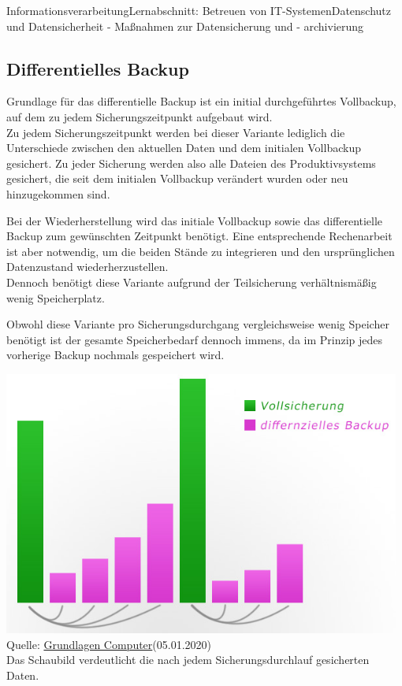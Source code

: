 \documentclass[11pt,oneside,openany,headings=optiontotoc,11pt,numbers=noenddot]{article}
\begin{document}
\begin{worksheet}{Informationsverarbeitung}{Lernabschnitt: Betreuen von IT-Systemen}{Datenschutz und Datensicherheit - Maßnahmen zur Datensicherung und - archivierung}
		\subsection{Differentielles Backup}
		Grundlage für das differentielle Backup ist ein initial durchgeführtes Vollbackup, auf dem zu jedem Sicherungszeitpunkt aufgebaut wird.\\
		Zu jedem Sicherungszeitpunkt werden bei dieser Variante lediglich die Unterschiede zwischen den aktuellen Daten und dem initialen Vollbackup gesichert. Zu jeder Sicherung werden also alle Dateien des Produktivsystems gesichert, die seit dem initialen Vollbackup verändert wurden oder neu hinzugekommen sind.\\
		\par\noindent
		Bei der Wiederherstellung wird das initiale Vollbackup sowie das differentielle Backup zum gewünschten Zeitpunkt benötigt. Eine entsprechende Rechenarbeit ist aber notwendig, um die beiden Stände zu integrieren und den ursprünglichen Datenzustand wiederherzustellen.\\
		Dennoch benötigt diese Variante aufgrund der Teilsicherung verhältnismäßig wenig Speicherplatz.\\
		\par\noindent
		Obwohl diese Variante pro Sicherungsdurchgang vergleichsweise wenig Speicher benötigt ist der gesamte Speicherbedarf dennoch immens, da im Prinzip jedes vorherige Backup nochmals gespeichert wird.\\
		\par\noindent
		\includegraphics[width=0.98\textwidth]{../99_Bilder/01_diff.jpg}\\
		\tiny{Quelle: \href{https://www.grundlagen-computer.de/backup/backup-strategien-inkrementell-differentiell-und-vollbackup}{Grundlagen Computer}(05.01.2020)}\\
		\footnotesize{Das Schaubild verdeutlicht die nach jedem Sicherungsdurchlauf gesicherten Daten.}\normalsize

\end{worksheet}
\end{document}

